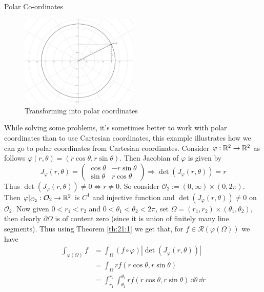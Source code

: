 \documentclass[../Analysis-3.tex]{subfiles}
\begin{document}
\begin{Eg}{Polar Co-ordinates}{}
  \begin{figure}
    \centering
    \includegraphics[width=0.5\textwidth]{../figures/lec21.1.png}
    \caption{Transforming into polar coordinates}
    \label{fig1:21}
  \end{figure}
  While solving some problems, it's sometimes better to work with polar coordinates than to use Cartesian coordinates, this example illustrates how we can go to polar coordinates from Cartesian coordinates.
  Consider $\varphi : \mathbb{R}^2 \to \mathbb{R}^2$ as follows $\varphi(r,\theta) = (r \cos\theta, r \sin\theta)$. Then Jacobian of $\varphi$ is given by
  \[
    J_{\varphi}(r,\theta) = \begin{pmatrix}
      \cos\theta & -r\sin\theta \\
      \sin\theta & r\cos\theta
    \end{pmatrix} \Rightarrow \det(J_{\varphi}(r,\theta)) = r
  \]
  Thus $\det(J_{\varphi}(r,\theta)) \neq 0 \Leftrightarrow r \neq 0$. So consider $\mathcal{O}_2 := (0,\infty) \times (0,2\pi)$. Then $\varphi\vert_{\mathcal{O}_2} : \mathcal{O}_2 \to \mathbb{R}^2$ is $C^1$ and injective function and $\det(J_{\varphi}(r,\theta)) \neq 0 $ on $\mathcal{O}_2$. Now given $0 < r_1 < r_2$ and $0 < \theta_1 < \theta_2 < 2\pi$, set $\Omega = (r_1, r_2) \times (\theta_1, \theta_2)$, then clearly $\partial \Omega$ is of content zero (since it is union of finitely many line segments). Thus using Theorem \ref{th:21:1} we get that, for $f \in \mathscr{R}(\varphi(\Omega))$ we have
  \begin{align*}
    \int_{\varphi(\Omega)} f & = \int_{\Omega} (f \circ \varphi) |\det (J_{\varphi}(r,\theta))|                                 \\
                             & = \int_{\Omega} r f(r\cos\theta, r\sin\theta)                                                    \\
                             & = \int_{r_1}^{r_2} \int_{\theta_1}^{\theta_2} r f(r\cos\theta, r\sin\theta)\, \dd\theta \, \dd r
  \end{align*}


\end{Eg}
\end{document}

